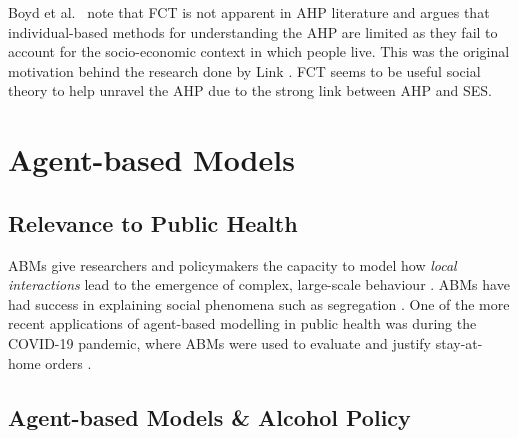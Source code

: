 Boyd et al.~\cite{Boyd2021} note that \ac{FCT} is not apparent in \ac{AHP} literature and argues that individual-based methods for understanding the \ac{AHP} are limited as they fail to account for the socio-economic context in which people live. This was the original motivation behind the research done by Link \cite{FCTorigin}. \ac{FCT} seems to be useful social theory to help unravel the \ac{AHP} due to the strong link between \ac{AHP} and \ac{SES}.





\section{Agent-based Models}


\subsection{Relevance to Public Health}



\ac{ABM}s give researchers and policymakers the capacity to model how \textit{local interactions} lead to the emergence of complex, large-scale behaviour \cite{abmEpstein, abmGeneral}. \ac{ABM}s have had success in explaining social phenomena such as segregation \cite{schelling}.  One of the more recent applications of agent-based modelling in public health was during the COVID-19 pandemic, where \ac{ABM}s were used to evaluate and justify stay-at-home orders \cite{covidABM}. 

\subsection{Agent-based Models \& Alcohol Policy}

